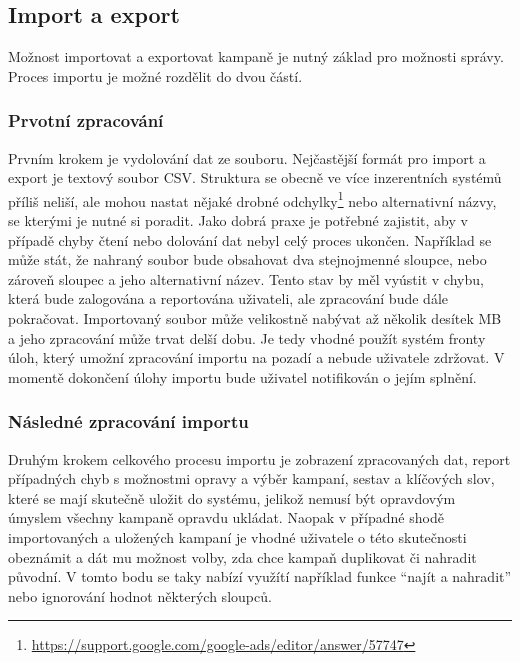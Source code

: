 
\subsection{Import a export}
Možnost importovat a exportovat kampaně je nutný základ pro možnosti správy. Proces importu je možné rozdělit do dvou částí.

\subsubsection{Prvotní zpracování}
Prvním krokem je vydolování dat ze souboru. Nejčastější formát pro import a export je textový soubor CSV. Struktura se obecně ve více inzerentních
systémů příliš neliší, ale mohou nastat nějaké drobné odchylky\footnote{\href{https://support.google.com/google-ads/editor/answer/57747}{https://support.google.com/google-ads/editor/answer/57747}}
nebo alternativní názvy, se kterými je nutné si poradit. Jako dobrá praxe je potřebné zajistit, aby v případě chyby čtení nebo dolování dat nebyl celý
proces ukončen. Například se může stát, že nahraný soubor bude obsahovat dva stejnojmenné sloupce, nebo zároveň sloupec a jeho alternativní název. Tento
stav by měl vyústit v chybu, která bude zalogována a reportována uživateli, ale zpracování bude dále pokračovat. 
Importovaný soubor může velikostně nabývat až několik desítek MB a jeho zpracování může trvat delší
dobu. Je tedy vhodné použít systém fronty úloh, který umožní zpracování importu na pozadí a nebude uživatele zdržovat. V momentě dokončení úlohy importu
bude uživatel notifikován o jejím splnění.

\subsubsection{Následné zpracování importu}
Druhým krokem celkového procesu importu je zobrazení zpracovaných dat, report případných chyb s možnostmi opravy a výběr kampaní, sestav a klíčových slov,
které se mají skutečně uložit do systému, jelikož nemusí být opravdovým úmyslem všechny kampaně opravdu ukládat.
Naopak v případné shodě importovaných a uložených kampaní je vhodné uživatele o této skutečnosti
obeznámit a dát mu možnost volby, zda chce kampaň duplikovat či nahradit původní. 
V tomto bodu se taky nabízí využítí například funkce \enquote{najít a nahradit} nebo ignorování hodnot některých sloupců.

